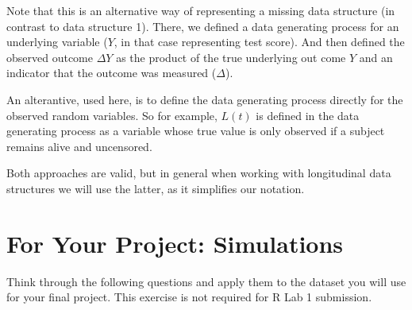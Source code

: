\documentclass[answers]{exam}
\newenvironment{myfigure}{\captionsetup{type=mytype}}{}
\begin{document}
\begin{solution}
Note that this is an alternative way of representing a missing data structure (in contrast to data structure 1). There, we defined a data generating process for an underlying variable ($Y$, in that case representing test score). And then defined the observed outcome $\Delta Y$ as the product of the true underlying out come $Y$ and an indicator that the outcome was measured ($\Delta$).

An alterantive, used here, is to define the data generating process directly for the observed random variables. So for example, $L(t)$ is defined in the data generating process as a variable whose true value is only observed if a subject remains alive and uncensored.

Both approaches are valid, but in general when working with longitudinal data structures we will use the latter, as it simplifies our notation.  


\end{solution}
\pagebreak

\section{For Your Project: Simulations}

Think through the following questions and apply them to the dataset you will use for your final project. This exercise is not required for R Lab 1 submission.
\end{document}
